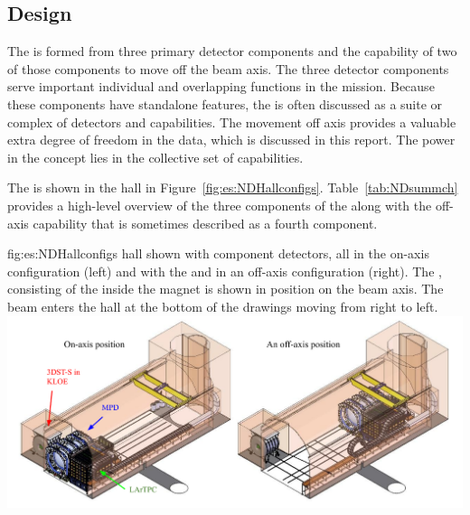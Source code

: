 \subsection{Design}
\label{sec:exsum-nd-BriefOverview-design}


The   is formed from three primary detector components and the capability of two of those components to move off the beam axis. The three detector components serve important individual and overlapping functions in the  mission.  Because these components have standalone features, the   is often discussed as a suite or complex of detectors and capabilities.  The movement off axis provides a valuable extra degree of freedom in the data, which is discussed in this report.  The power in the   concept lies in the collective set of capabilities.  

The   is shown in the   hall in Figure~\ref{fig:es:NDHallconfigs}.  Table~\ref{tab:NDsummch} provides a high-level overview of the three components of the   along with the off-axis capability that is sometimes described as a fourth component.  

\begin{dunefigure}{fig:es:NDHallconfigs}
{  hall shown with component detectors, all in the on-axis configuration (left) and with the  and  in an off-axis configuration (right). The , consisting of the   inside the  magnet is shown in position on the beam axis. The beam enters the hall at the bottom of the drawings moving from right to left.}
\includegraphics[width=\textwidth]{graphics/hall_drawing_oct_19.pdf}
\end{dunefigure}



